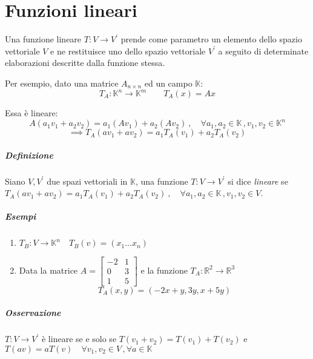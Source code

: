 \chapter{Funzioni lineari}
	Una funzione lineare $T: V \rightarrow V^\prime$ prende come parametro un elemento dello spazio vettoriale $V$ e ne restituisce uno dello spazio vettoriale $V^\prime$ a seguito di determinate elaborazioni descritte dalla funzione stessa.
	
	Per esempio, dato una matrice $A_{n \times n}$ ed un campo $\mathbb{K}$:
	$$T_A : \mathbb{K}^n \rightarrow \mathbb{K}^m \qquad T_A (x) = A x$$
	
	Essa è lineare:
	$$A (a_1 v_1 + a_2 v_2) = a_1 (A v_1) + a_2 (A v_2) \: , \quad \forall a_1, a_2 \in \mathbb{K} \, , v_1, v_2 \in \mathbb{K}^n$$
	$$\implies T_A (a v_1 + a v_2) = a_1 T_A (v_1) + a_2 T_A (v_2)$$
	
	\paragraph{Definizione} Siano $V, V^\prime$ due spazi vettoriali in $\mathbb{K}$, una funzione $T: V \rightarrow V^\prime$ si dice \emph{lineare} se $T_A (a v_1 + a v_2) = a_1 T_A (v_1) + a_2 T_A (v_2) \: , \quad \forall a_1, a_2 \in \mathbb{K} \, , v_1, v_2 \in V$.
	
	\begin{GrayBox}
		\paragraph{Esempi}
		\begin{enumerate}[(1)]
			\item $T_B : V \rightarrow \mathbb{K}^n \quad T_B (v) = (x_1 \dots x_n)$
			\item Data la matrice $A = \begin{bmatrix}
				-2 & 1 \\
				0 & 3 \\
				1 & 5
			\end{bmatrix}$ e la funzione $T_A : \mathbb{R}^2 \rightarrow \mathbb{R}^3$
			$$T_A (x, y) = (-2 x + y, 3 y, x + 5 y) $$
		\end{enumerate}
	\end{GrayBox}

	\paragraph{Osservazione} $T: V \rightarrow V^\prime$ è lineare se e solo se $T (v_1 + v_2) = T(v_1) + T(v_2)$ e $T(av) = a T (v) \quad \forall v_1, v_2 \in V \, , \forall a \in \mathbb{K}$
	
